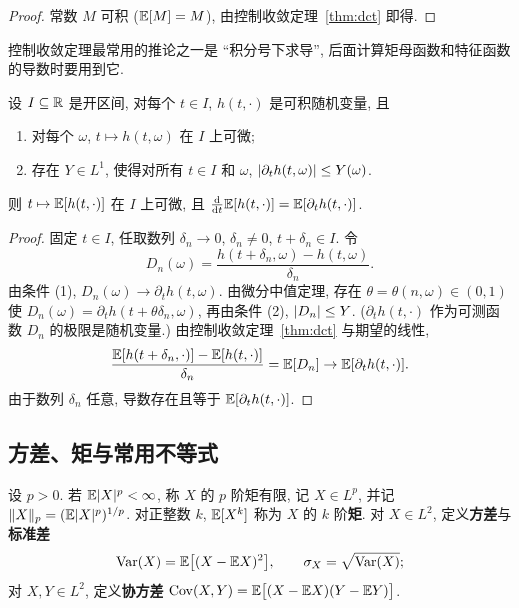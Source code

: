 \begin{proof}
常数 $M$ 可积 ($\mathbb{E}[M]=M$), 由控制收敛定理~\ref{thm:dct} 即得.
\end{proof}

控制收敛定理最常用的推论之一是 ``积分号下求导'', 后面计算矩母函数和特征函数的导数时要用到它.

\begin{theorem}[期望号下求导]\label{thm:diff-under-E}
设 $I\subseteq\mathbb{R}$ 是开区间, 对每个 $t\in I$, $h(t,\cdot)$ 是可积随机变量, 且
\begin{enumerate}
\item 对每个 $\omega$, $t\mapsto h(t,\omega)$ 在 $I$ 上可微;
\item 存在 $Y\in L^1$, 使得对所有 $t\in I$ 和 $\omega$, $\lvert\partial_t h(t,\omega)\rvert\le Y(\omega)$.
\end{enumerate}
则 $t\mapsto\mathbb{E}[h(t,\cdot)]$ 在 $I$ 上可微, 且 $\frac{\mathop{}\!\mathrm{d}}{\mathop{}\!\mathrm{d} t}\mathbb{E}[h(t,\cdot)]=\mathbb{E}[\partial_t h(t,\cdot)]$.
\end{theorem}

\begin{proof}
固定 $t\in I$, 任取数列 $\delta_n\to0$, $\delta_n\ne0$, $t+\delta_n\in I$. 令
\[
D_n(\omega)=\frac{h(t+\delta_n,\omega)-h(t,\omega)}{\delta_n}.
\]
由条件 (1), $D_n(\omega)\to\partial_t h(t,\omega)$. 由微分中值定理, 存在 $\theta=\theta(n,\omega)\in(0,1)$ 使 $D_n(\omega)=\partial_t h(t+\theta\delta_n,\omega)$, 再由条件 (2), $\lvert D_n\rvert\le Y$. ($\partial_t h(t,\cdot)$ 作为可测函数 $D_n$ 的极限是随机变量.) 由控制收敛定理~\ref{thm:dct} 与期望的线性,
\[
\frac{\mathbb{E}[h(t+\delta_n,\cdot)]-\mathbb{E}[h(t,\cdot)]}{\delta_n}=\mathbb{E}[D_n]\to\mathbb{E}[\partial_t h(t,\cdot)].
\]
由于数列 $\delta_n$ 任意, 导数存在且等于 $\mathbb{E}[\partial_t h(t,\cdot)]$.
\end{proof}

\subsection{方差、矩与常用不等式}

\begin{definition}[矩与方差]\label{def:moments}
设 $p>0$. 若 $\mathbb{E}\lvert X\rvert^p<\infty$, 称 $X$ 的 $p$ 阶矩有限, 记 $X\in L^p$, 并记 $\lVert X\rVert_p=(\mathbb{E}\lvert X\rvert^p)^{1/p}$. 对正整数 $k$, $\mathbb{E}[X^k]$ 称为 $X$ 的 $k$ 阶\textbf{矩}. 对 $X\in L^2$, 定义\textbf{方差}与\textbf{标准差}
\[
\operatorname{Var}(X)=\mathbb{E}\big[(X-\mathbb{E} X)^2\big],\qquad \sigma_X=\sqrt{\operatorname{Var}(X)};
\]
对 $X,Y\in L^2$, 定义\textbf{协方差} $\operatorname{Cov}(X,Y)=\mathbb{E}\big[(X-\mathbb{E} X)(Y-\mathbb{E} Y)\big]$.
\end{definition}


